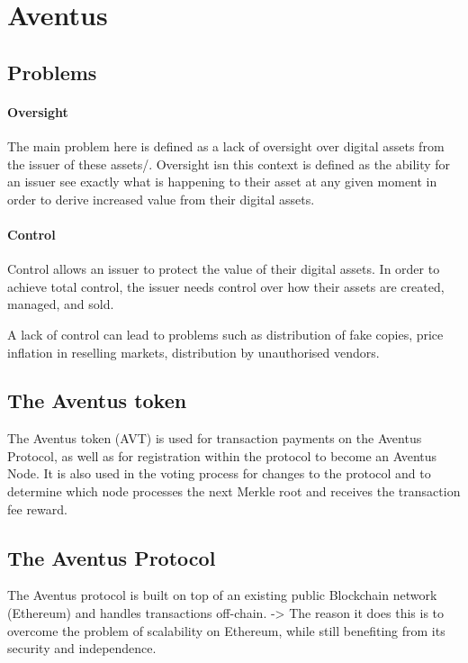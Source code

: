 
\section{Aventus}

\subsection{Problems}
\paragraph{Oversight}

The main problem here is defined as a lack of oversight over digital assets from the issuer of these assets/. Oversight isn this context is defined as the ability for an issuer see exactly what is happening to their asset at any given moment in order to derive increased value from their digital assets.

\paragraph{Control}

Control allows an issuer to protect the value of their digital assets. In order to achieve total control, the issuer needs control over how their assets are created, managed, and sold.

A lack of control can lead to problems such as distribution of fake copies, price inflation in reselling markets, distribution by unauthorised vendors.

\subsection{The Aventus token}

The Aventus token (AVT) is used for transaction payments on the Aventus Protocol, as well as for registration within the protocol to become an Aventus Node. It is also used in the voting process for changes to the protocol and to determine which node processes the next Merkle root and receives the transaction fee reward.

\subsection{The Aventus Protocol}

The Aventus protocol is built on top of an existing public Blockchain network (Ethereum) and handles transactions off-chain.
-> The reason it does this is to overcome the problem of scalability on Ethereum, while still benefiting from its security and independence.

